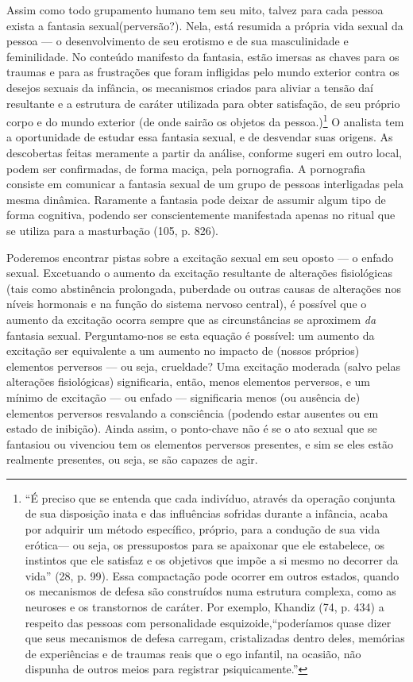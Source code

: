 Assim como todo grupamento humano tem seu mito, talvez para cada
pessoa exista a fantasia sexual\idxfanta[|(] (perversão?). Nela, está resumida a
própria vida sexual da pessoa --- o desenvolvimento de seu erotismo e
de sua masculinidade e feminilidade. No conteúdo manifesto da fantasia,
estão imersas as chaves para os traumas e para as frustrações que foram
infligidas pelo mundo exterior contra os desejos sexuais da infância,
os mecanismos criados para aliviar a tensão daí resultante e a
estrutura de caráter utilizada para obter satisfação, de seu próprio
corpo e do mundo exterior (de onde sairão os objetos da pessoa.)\footnote{ ``É preciso que se
entenda que cada indivíduo,
através da operação conjunta de sua disposição inata e das influências
sofridas durante a infância, acaba por adquirir um método específico,
próprio, para a condução de sua vida erótica\idxfreuddesen[|nn] --- ou seja, os
pressupostos para se apaixonar que ele estabelece, os instintos que ele
satisfaz e os objetivos que impõe a si mesmo no decorrer da
vida'' (28, p. 99). Essa compactação pode ocorrer em
outros estados, quando os mecanismos de defesa são construídos numa
estrutura complexa, como as neuroses e os transtornos de caráter. Por
exemplo, Khan\idxkhan[|nn] diz (74, p. 434) a respeito das pessoas com personalidade
esquizoide,\idxesquiz[|nn] ``poderíamos quase dizer que seus mecanismos
de defesa carregam, cristalizadas dentro deles, memórias de experiências
e de traumas reais\idxfantareal{} que o ego infantil, na ocasião, não dispunha de
outros meios para registrar psiquicamente.''} O analista
tem a oportunidade de estudar essa fantasia sexual, e de desvendar suas
origens. As descobertas feitas meramente a partir da análise, conforme
sugeri em outro local, podem ser confirmadas, de forma maciça, pela
pornografia.\idxpornofant{} A pornografia consiste em comunicar a fantasia sexual de
um grupo de pessoas interligadas pela mesma dinâmica. Raramente a
fantasia pode deixar de assumir algum tipo de forma cognitiva, podendo
ser conscientemente manifestada apenas no ritual que se utiliza para a
masturbação (105, p. 826).

Poderemos encontrar pistas sobre a excitação sexual em seu oposto
--- o enfado sexual. Excetuando o aumento da excitação resultante de
alterações fisiológicas (tais como abstinência prolongada, puberdade ou
outras causas de alterações nos níveis hormonais e na função do sistema
nervoso central), é possível que o aumento da excitação ocorra sempre
que as circunstâncias se aproximem \textit{da} fantasia sexual.
Perguntamo-nos se esta equação é possível: um aumento da excitação ser
equivalente a um aumento no impacto de (nossos próprios) elementos
perversos --- ou seja, crueldade? Uma excitação moderada (salvo pelas
alterações fisiológicas) significaria, então, menos elementos
perversos, e um mínimo de excitação --- ou enfado\idxenfafamil{} --- significaria
menos (ou ausência de) elementos perversos resvalando a consciência
(podendo estar ausentes ou em estado de inibição). Ainda assim, o
ponto-chave não é se o ato sexual que se fantasiou ou vivenciou tem os
elementos perversos presentes, e sim se eles estão realmente presentes,
ou seja, se são capazes de agir.

